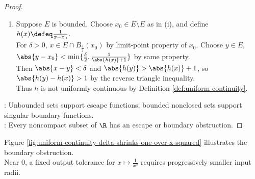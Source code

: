 \begin{theorem}
\begin{proof}
\begin{enumerate}[label=(\roman*)]
Choose $x_0\in\overline{E}\setminus E$ as in (i), define $g(x)\defeq\frac{1}{1+(x-x_0)^2}$. Then $(\forall x\in E)\ 0<g(x)<1$.\\
Given $\varepsilon>0$, $x\in E\cap B_{\sqrt{\varepsilon}}(x_0)$ by limit-point property of $x_0$; $1-g(x)=\frac{(x-x_0)^2}{1+(x-x_0)^2}<\varepsilon$. Hence $\sup\limits_E g=1$, which is not attained.
\item Suppose $E$ is bounded. Choose $x_0\in\overline{E}\setminus E$ as in (i), and define $h(x)\defeq\frac{1}{x-x_0}$.\\
For $\delta>0$, $x\in E\cap B_{\frac{\delta}{2}}(x_0)$ by limit-point property of $x_0$. Choose $y\in E$, $\abs{y-x_0}<\min\{\frac{\delta}{2},\frac{1}{\abs{h(x)}+1}\}$ by same property.\\
Then $\abs{x-y}<\delta$ and $\abs{h(y)}>\abs{h(x)}+1$, so $\abs{h(y)-h(x)}>1$ by the reverse triangle inequality.\\
Thus $h$ is not uniformly continuous by Definition \ref{def:uniform-continuity}.
\end{enumerate}
: Unbounded sets support escape functions; bounded nonclosed sets support singular boundary functions.\\
: Every noncompact subset of $\R$ has an escape or boundary obstruction.
\end{proof}
\end{theorem}

\noindent Figure \ref{fig:uniform-continuity-delta-shrinks-one-over-x-squared} illustrates the boundary obstruction.\\
Near $0$, a fixed output tolerance for $x\mapsto\frac{1}{x^2}$ requires progressively smaller input radii.

\begin{visualizationfigure}[H]
  \centering
  
  \caption{Dimensionless $y=\frac{1}{x^2}$ graph for $x>0$: input radii $\delta_i$ shrink as $x_i\to0$; orange marks the fixed $2\varepsilon$ output tolerance.}
  \label{fig:uniform-continuity-delta-shrinks-one-over-x-squared}
\end{visualizationfigure}

